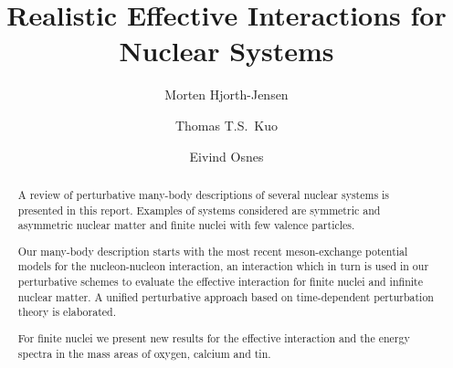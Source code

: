 


\newcommand{\bra}[1]{\left\langle #1 \right|}
\newcommand{\ket}[1]{\left| #1 \right\rangle}
\newcommand{\qbox}{$\hat{Q}$-box }
\newcommand{\nl}[1]{\line(1,0){10}\raisebox{-0.6ex}{ #1}}
\newcommand{\ndot}{\line(1,0){2}\hspace{0.2cm}\line(1,0)
{2}\hspace{0.2cm}\line(1,0){2}\raisebox{-0.6ex}}




\begin{frontmatter}

\title{Realistic Effective Interactions for Nuclear Systems}

\author{Morten Hjorth-Jensen}
\address{Department of Physics, University of  Oslo, N-0316 Oslo, Norway\\
         and\\ECT*, European Centre for Studies in Theoretical Nuclear Physics
         and Related Areas, Trento, Italy}
\author{Thomas T.S.\ Kuo}
\address{Department of Physics, State University of New York at Stony Brook,
NY 11794, USA}
\author{Eivind Osnes}
\address{Department of Physics, University of  Oslo, N-0316 Oslo, Norway}


\maketitle

\begin{abstract}

A review of perturbative many-body descriptions of several nuclear
systems is presented in this report. Examples of systems considered
are symmetric and asymmetric nuclear matter and
finite
nuclei with few valence particles.

Our many-body description starts with the most recent meson-exchange
potential models for the nucleon-nucleon interaction, an interaction
which in turn is used in our perturbative schemes to evaluate 
the effective interaction for finite nuclei and infinite nuclear
matter.
A unified perturbative approach based on time-dependent perturbation
theory is elaborated.

For finite nuclei we present new results for the effective interaction 
and the energy spectra in the mass
areas of oxygen, calcium and tin.

\end{abstract}

\end{frontmatter}

